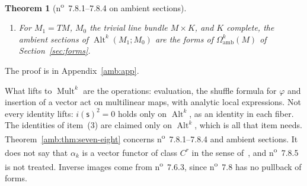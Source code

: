 \documentclass[11pt]{amsart}
\newtheorem{theorem}{Theorem}[section]
\theoremstyle{definition}
\theoremstyle{remark}
\numberwithin{equation}{section}
\newcommand{\Alt}{\operatorname{Alt}}
\newcommand{\Mult}{\operatorname{Mult}}
\theoremstyle{plain}
\theoremstyle{definition}
\theoremstyle{plain}
\begin{document}
\begin{theorem}[n\textsuperscript{o}~7.8.1--7.8.4 on ambient sections]
\begin{enumerate}
\begin{enumerate}
\item for $k\ge1$ the interior product $i$ is a bilinear operation from $M_1$ and $\Alt^k(M_1;\mathsf A)$ to $\Alt^{k-1}(M_1;\mathsf A)$ (n\textsuperscript{o}~7.8.4), and Bourbaki's formulas (1)--(7) of n\textsuperscript{o}~7.8.2--7.8.4 hold;
\item for analytic $\gamma\colon M'\to M$, the bundle $\Alt^k(\gamma^*M_1;\gamma^*M_0)$ is the inverse image of the filtered bundle $\Alt^k(M_1;M_0)$, with transitions $\Theta_{\mathsf{ab}}\circ\gamma$, and $\omega\circ\gamma$ is an ambient section of it for ambient $\omega$ (n\textsuperscript{o}~7.6.3).
\end{enumerate}
\item For $M_1=TM$, $M_0$ the trivial line bundle $M\times K$, and $K$ complete, the ambient sections of $\Alt^k(M_1;M_0)$ are the forms of $\Omega^k_{\mathrm{amb}}(M)$ of Section~\ref{sec:forms}.
\end{enumerate}
\end{theorem}

The proof is in Appendix~\ref{amb:app}.

What lifts to $\Mult^k$ are the operations: evaluation, the shuffle formula for $\varphi$ and insertion of a vector act on multilinear maps, with analytic local expressions. Not every identity lifts: $i(\mathsf s)^2=0$ holds only on $\Alt^k$, as an identity in each fiber. The identities of item~(3) are claimed only on $\Alt^k$, which is all that item needs. Theorem~\ref{amb:thm:seven-eight} concerns n\textsuperscript{o}~7.8.1--7.8.4 and ambient sections. It does not say that $\alpha_k$ is a vector functor of class $C^r$ in the sense of~\cite[n\textsuperscript{o}~7.6.1]{Bou}, and n\textsuperscript{o}~7.8.5 is not treated. Inverse images come from n\textsuperscript{o}~7.6.3, since n\textsuperscript{o}~7.8 has no pullback of forms.
\end{document}
